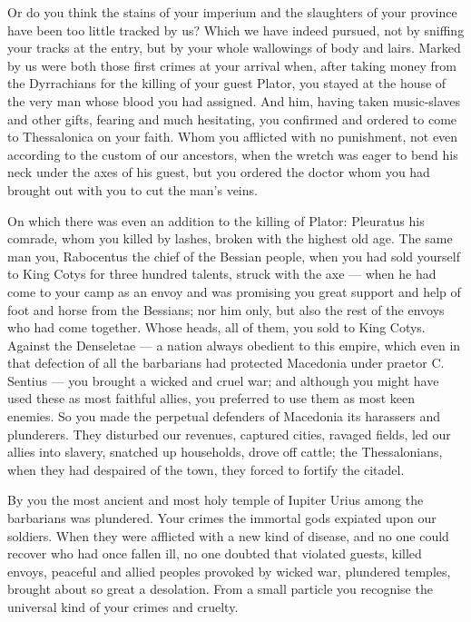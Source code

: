 Or do you think the stains of your imperium and the slaughters of your province have been too little tracked by us? Which we have indeed pursued, not by sniffing your tracks at the entry, but by your whole wallowings of body and lairs. Marked by us were both those first crimes at your arrival when, after taking money from the Dyrrachians for the killing of your guest Plator, you stayed at the house of the very man whose blood you had assigned. And him, having taken music-slaves and other gifts, fearing and much hesitating, you confirmed and ordered to come to Thessalonica on your faith. Whom you afflicted with no punishment, not even according to the custom of our ancestors, when the wretch was eager to bend his neck under the axes of his guest, but you ordered the doctor whom you had brought out with you to cut the man's veins.

 On which there was even an addition to the killing of Plator: Pleuratus his comrade, whom you killed by lashes, broken with the highest old age. The same man you, Rabocentus the chief of the Bessian people, when you had sold yourself to King Cotys for three hundred talents, struck with the axe — when he had come to your camp as an envoy and was promising you great support and help of foot and horse from the Bessians; nor him only, but also the rest of the envoys who had come together. Whose heads, all of them, you sold to King Cotys. Against the Denseletae — a nation always obedient to this empire, which even in that defection of all the barbarians had protected Macedonia under praetor C. Sentius — you brought a wicked and cruel war; and although you might have used these as most faithful allies, you preferred to use them as most keen enemies. So you made the perpetual defenders of Macedonia its harassers and plunderers. They disturbed our revenues, captured cities, ravaged fields, led our allies into slavery, snatched up households, drove off cattle; the Thessalonians, when they had despaired of the town, they forced to fortify the citadel.

 By you the most ancient and most holy temple of Iupiter Urius among the barbarians was plundered. Your crimes the immortal gods expiated upon our soldiers. When they were afflicted with a new kind of disease, and no one could recover who had once fallen ill, no one doubted that violated guests, killed envoys, peaceful and allied peoples provoked by wicked war, plundered temples, brought about so great a desolation. From a small particle you recognise the universal kind of your crimes and cruelty.

